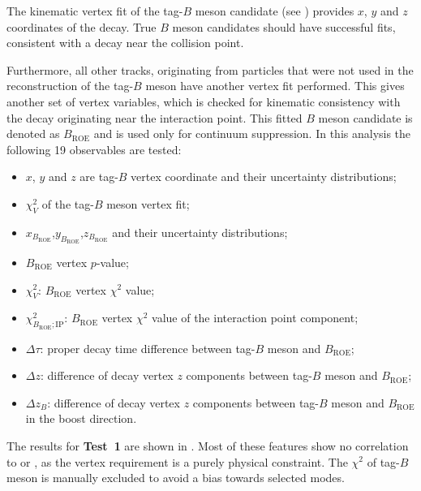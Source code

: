 The kinematic vertex fit of the tag-$B$ meson candidate (see ) provides $x$, $y$ and $z$ coordinates of the decay.
True $B$ meson candidates should have successful fits, consistent with a decay near the collision point.

Furthermore, all other tracks, originating from particles that were not used in the reconstruction of the tag-$B$ meson have another vertex fit performed.
This gives another set of vertex variables, which is checked for kinematic consistency with the decay originating near the interaction point.
This fitted $B$ meson candidate is denoted as $B_{\mathrm{ROE}}$ and is used only for continuum suppression.
In this analysis the following 19 observables are tested:
\begin{itemize}
    \item $x$, $y$ and $z$ are tag-$B$ vertex coordinate and their uncertainty distributions;
    \item $\chi_V^2$ of the tag-$B$ meson vertex fit;
    \item $x_{B_{\mathrm{ROE}}}$,$y_{B_{\mathrm{ROE}}}$,$z_{B_{\mathrm{ROE}}}$ and their uncertainty distributions;
    \item $B_{\mathrm{ROE}}$ vertex $p$-value;
    \item $\chi^2_{V}$: $B_{\mathrm{ROE}}$ vertex $\chi^2$ value;
    \item $\chi^2_{B_{\mathrm{ROE}};\mathrm{IP}}$: $B_{\mathrm{ROE}}$ vertex $\chi^2$ value of the interaction point component;
    \item $\Delta \tau$: proper decay time difference between tag-$B$ meson and $B_{\mathrm{ROE}}$;
    \item $\Delta z$: difference of decay vertex $z$ components between tag-$B$ meson and $B_{\mathrm{ROE}}$;
    \item $\Delta z_B$: difference of decay vertex $z$ components between tag-$B$ meson and $B_{\mathrm{ROE}}$ in the boost direction.
\end{itemize}

The results for \textbf{Test~1} are shown in .
Most of these features show no correlation to \EB or \Estar, as the vertex requirement is a purely physical constraint.
The $\chi^2$ of tag-$B$ meson is manually excluded to avoid a bias towards selected \FEI modes.

